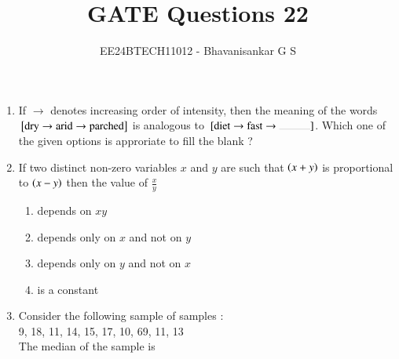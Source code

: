 \documentclass[journal]{IEEEtran}
\begin{document}

\vspace{3cm}

\title{GATE Questions 22}
\author{EE24BTECH11012 - Bhavanisankar G S}
{\let\newpage\relax\maketitle}
\begin{enumerate}
	\item If $\to$ denotes increasing order of intensity, then the meaning of the words ${}\left[\text{dry} \to \text{arid} \to \text{parched}\right]$ is analogous to $\sbrak{\text{diet} \to \text{fast} \to \rule{1cm}{0.1pt}}$. Which one of the given options is approriate to fill the blank ?
		\begin{enumerate}
		\end{enumerate}
	\item If two distinct non-zero variables $x$ and $y$ are such that $\left(x+y\right)$ is proportional to $\left(x-y\right)$ then the value of $\frac{x}{y}$ 
		\begin{enumerate}
			\item depends on $xy$
			\item depends only on $x$ and not on $y$
			\item depends only on $y$ and not on $x$
			\item is a constant
		\end{enumerate}
	\item Consider the following sample of samples : \\
		9, 18, 11, 14, 15, 17, 10, 69, 11, 13 \\
		The median of the sample is
		\begin{enumerate}
\end{enumerate}
\end{enumerate}
\end{document}
